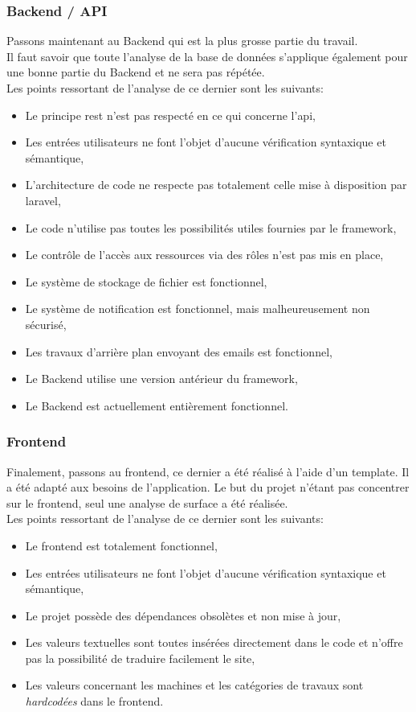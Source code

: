 \documentclass[
    iai, %
    il, %
]{heig-tb}
\begin{document}
\subsubsection{Backend / API}
Passons maintenant au Backend qui est la plus grosse partie du travail.\\
Il faut savoir que toute l'analyse de la base de données s'applique également pour une bonne partie du Backend et ne sera pas répétée.\\
Les points ressortant de l'analyse de ce dernier sont les suivants:
\begin{itemize}
    \item Le principe \Gls{rest} n'est pas respecté en ce qui concerne l'\Gls{api},
    \item Les entrées utilisateurs ne font l'objet d'aucune vérification syntaxique et sémantique,
    \item L'architecture de code ne respecte pas totalement celle mise à disposition par \Gls{laravel},
    \item Le code n'utilise pas toutes les possibilités utiles fournies par le \gls{framework},
    \item Le contrôle de l'accès aux ressources via des rôles n'est pas mis en place,
    \item Le système de stockage de fichier est fonctionnel,
    \item Le système de notification est fonctionnel, mais malheureusement non sécurisé,
    \item Les travaux d'arrière plan envoyant des emails est fonctionnel,
    \item Le Backend utilise une version antérieur du framework,
    \item Le Backend est actuellement entièrement fonctionnel.
\end{itemize}

\subsubsection{Frontend}
Finalement, passons au frontend, ce dernier a été réalisé à l'aide d'un \gls{template}. Il a été adapté aux besoins de l'application. Le but du projet n'étant pas concentrer sur le frontend, seul une analyse de surface a été réalisée.\\
Les points ressortant de l'analyse de ce dernier sont les suivants:
\begin{itemize}
    \item Le frontend est totalement fonctionnel,
    \item Les entrées utilisateurs ne font l'objet d'aucune vérification syntaxique et sémantique,
    \item Le projet possède des dépendances obsolètes et non mise à jour,
    \item Les valeurs textuelles sont toutes insérées directement dans le code et n'offre pas la possibilité de traduire facilement le site,
    \item Les valeurs concernant les machines et les catégories de travaux sont \emph{hardcodées} dans le frontend.
\end{itemize}
\end{document}
